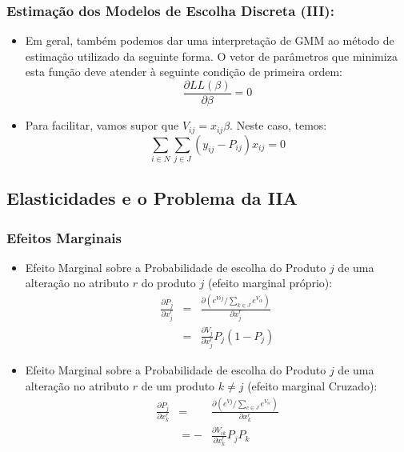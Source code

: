 \documentclass{beamer}
\begin{document}
\begin{frame}\frametitle{Estimação dos Modelos de Escolha Discreta (III):}
\begin{itemize}
\item Em geral, também podemos dar uma interpretação de GMM ao método de
estimação utilizado da seguinte forma. O vetor de parâmetros que minimiza
esta função deve atender à seguinte condição de primeira ordem:
\[
\frac{\partial LL(\beta)}{\partial\beta}=0
\]
\item Para facilitar, vamos supor que $V_{ij}=x_{ij}\beta$. Neste caso,
temos:
\[
\sum_{i\in N}\sum_{j\in J}(y_{ij}-P_{ij})x_{ij}=0
\]
\end{itemize}
\end{frame}




\subsection{Elasticidades e o Problema da IIA}
\begin{frame}[fragile]\frametitle{Efeitos Marginais}
    \small
    \begin{itemize}
    	\item Efeito Marginal sobre a Probabilidade de escolha do Produto $j$ de uma alteração no atributo $r$ do produto $j$ (efeito marginal próprio):
	\begin{eqnarray*}
	\frac{\partial P_{j}}{\partial x_{j}^{r}} & = & \frac{\partial(e^{Vij}/\sum_{k\in J}e^{V_{ik}})}{\partial x_{j}^{r}}\\
	 & = & \frac{\partial V_{j}}{\partial x_{j}^{r}}P_{j}(1-P_{j})
	\end{eqnarray*}
		\item Efeito Marginal sobre a Probabilidade de escolha do Produto $j$ de uma alteração no atributo $r$ de um produto $k\neq j$ (efeito marginal Cruzado):
	\begin{eqnarray*}
	\frac{\partial P_{j}}{\partial x_{k}^{r}} & = & \frac{\partial(e^{Vj}/\sum_{c\in J}e^{V_{ic}})}{\partial x_{k}^{r}}\\
	 & =- & \frac{\partial V_{ik}}{\partial x_{k}^{r}}P_{j}P_{k}
	\end{eqnarray*}
		
    \end{itemize}


\end{frame}
\end{document}
